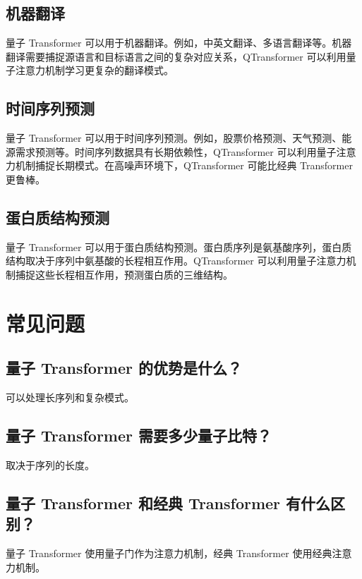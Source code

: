\documentclass[12pt,a4paper]{article}
\begin{document}
\subsection{机器翻译}

量子 Transformer 可以用于机器翻译。例如，中英文翻译、多语言翻译等。机器翻译需要捕捉源语言和目标语言之间的复杂对应关系，QTransformer 可以利用量子注意力机制学习更复杂的翻译模式。

\subsection{时间序列预测}

量子 Transformer 可以用于时间序列预测。例如，股票价格预测、天气预测、能源需求预测等。时间序列数据具有长期依赖性，QTransformer 可以利用量子注意力机制捕捉长期模式。在高噪声环境下，QTransformer 可能比经典 Transformer 更鲁棒。

\subsection{蛋白质结构预测}

量子 Transformer 可以用于蛋白质结构预测。蛋白质序列是氨基酸序列，蛋白质结构取决于序列中氨基酸的长程相互作用。QTransformer 可以利用量子注意力机制捕捉这些长程相互作用，预测蛋白质的三维结构。

\section{常见问题}

\subsection{量子 Transformer 的优势是什么？}

可以处理长序列和复杂模式。

\subsection{量子 Transformer 需要多少量子比特？}

取决于序列的长度。

\subsection{量子 Transformer 和经典 Transformer 有什么区别？}

量子 Transformer 使用量子门作为注意力机制，经典 Transformer 使用经典注意力机制。
\end{document}
